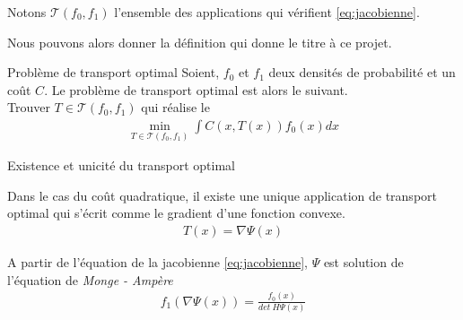 \documentclass[a4paper,12pt]{article}
\begin{document}
Notons $\mathcal{T}(f_0,f_1)$ l'ensemble des applications qui vérifient \eqref{eq:jacobienne}.



Nous pouvons alors donner la définition qui donne le titre à ce projet. 
\begin{definition}{Problème de transport optimal}
Soient, $f_0$ et $f_1$ deux densités de probabilité et un coût $C$. Le problème de transport optimal est alors le suivant.\\
Trouver $T\in\mathcal{T}(f_0,f_1)$ qui réalise le 
\begin{align}
\min_{T\in\mathcal{T}(f_0,f_1)} \int C(x,T(x)) f_0(x)dx
\label{eq:trspOpt}
\end{align}
\end{definition}


\begin{theoreme}{Existence et unicité du transport optimal}

\end{theoreme}
\begin{preuve}

\end{preuve}

\begin{theoreme}{}
Dans le cas du coût quadratique, il existe une unique application de transport optimal qui s'écrit comme le gradient d'une fonction convexe. 
\begin{align}
T(x) = \nabla \Psi(x)
\label{eq:opttrspGrdient}
\end{align}
\end{theoreme}
\begin{preuve}

\end{preuve}
A partir de l'équation de la jacobienne \eqref{eq:jacobienne}, $\Psi$ est solution de l'équation de \emph{Monge - Ampère} 
\begin{align}
f_1(\nabla\Psi(x)) = \frac{f_0(x)}{det\ H\Psi(x)}
\label{eq:mongemapere}
\end{align}
\end{document}
